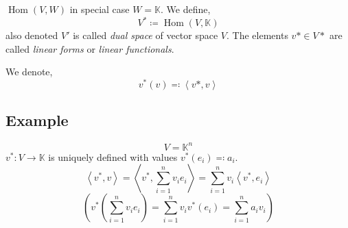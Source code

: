 \documentclass[a4paper,landscape,twocolumn]{article}
\newcommand\functional[1]{\left\langle{#1}\right\rangle}
\DeclareMathOperator\Hom{Hom} %
\begin{document}
%
$\Hom(V,W)$ in special case $W = \mathbb K$. We define,
\[ V^* \coloneqq \Hom(V,\mathbb K) \]
also denoted $V'$ is called \emph{dual space} of vector space $V$.
The elements $v* \in V*$ are called \emph{linear forms} or \emph{linear functionals}.

We denote,
\[ v^*(v) \eqqcolon \functional{v*,v} \]

\subsection{Example}
\[ V = \mathbb K^n \]
$v^*: V \to \mathbb K$ is uniquely defined with values $v^*(e_i) \eqqcolon a_i$.
\[ \functional{v^*,v} = \functional{v^*, \sum_{i=1}^n v_i e_i} = \sum_{i=1}^n v_i \functional{v^*,e_i} \]
\[ \left(v^*\left(\sum_{i=1}^n v_i e_i\right) = \sum_{i=1}^n v_i v^*(e_i) = \sum_{i=1}^n a_i v_i\right) \]
\end{document}

